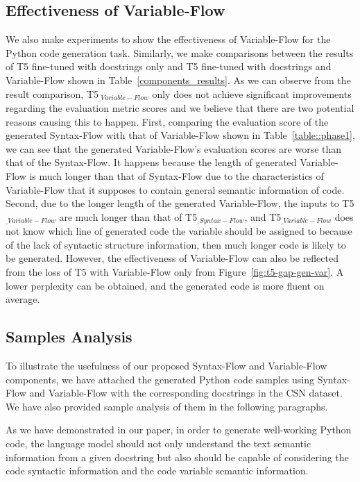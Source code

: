 \documentclass[11pt]{article}
\begin{document}
\subsection{Effectiveness of Variable-Flow}
We also make experiments to show the effectiveness of Variable-Flow for the Python code generation task. Similarly, we make comparisons between the results of T5 fine-tuned with docstrings only and T5 fine-tuned with docstrings and Variable-Flow shown in Table~\ref{components_results}. As we can observe from the result comparison, T5$_{\_{Variable-Flow}}$ only does not achieve significant improvements regarding the evaluation metric scores and we believe that there are two potential reasons causing this to happen. First, comparing the evaluation score of the generated Syntax-Flow with that of Variable-Flow shown in Table~\ref{table::phase1}, we can see that the generated Variable-Flow's evaluation scores are worse than that of the Syntax-Flow. It happens because the length of generated Variable-Flow is much longer than that of Syntax-Flow due to the characteristics of Variable-Flow that it supposes to contain general semantic information of code. Second, due to the longer length of the generated Variable-Flow, the inputs to T5$_{\_{Variable-Flow}}$ are much longer than that of T5$_{\_{Syntax-Flow}}$, and T5$_{\_{Variable-Flow}}$ does not know which line of generated code the variable should be assigned to because of the lack of syntactic structure information, then much longer code is likely to be generated. However, the effectiveness of Variable-Flow can also be reflected from the loss of T5 with Variable-Flow only from Figure~\ref{fig:t5-gap-gen-var}. A lower perplexity can be obtained, and the generated code is more fluent on average.




\subsection{Samples Analysis}
To illustrate the usefulness of our proposed Syntax-Flow and Variable-Flow components, we have attached the generated Python code samples using Syntax-Flow and Variable-Flow with the corresponding docstrings in the CSN dataset. We have also provided sample analysis of them in the following paragraphs. 

As we have demonstrated in our paper, in order to generate well-working Python code, the language model should not only understand the text semantic information from a given docstring but also should be capable of considering the code syntactic information and the code variable semantic information. 
 
\end{document}
